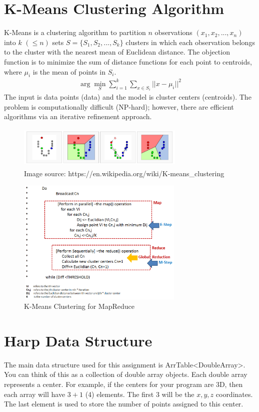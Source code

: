 \documentclass{article}
\begin{document}
\section*{K-Means Clustering Algorithm}
K-Means is a clustering algorithm to partition $n$ observations $(x_1,x_2,..., x_n)$ into $k$ $(\leq n)$ sets $S=\{S_1,S_2,...,S_k\}$ clusters in which each observation belongs to the cluster with the nearest mean of Euclidean distance. The objection function is to minimize the sum of distance functions for each point to centroids, where $\mu_i$ is the mean of points in $S_i$.
\begin{eqnarray*}
\arg\min\limits_S\sum\limits_{i=1}^k\sum\limits_{x\in S_i}{||x-\mu_i||}^2
\end{eqnarray*}
The input is data points (data) and the model is cluster centers (centroids). The problem is computationally difficult (NP-hard); however, there are efficient algorithms via an iterative refinement approach.

\begin{figure}[!htbp]
\includegraphics[width=8cm,height=2cm]{p7-1}
\centering
\caption{Image source: https://en.wikipedia.org/wiki/K-means\_clustering}
\end{figure}

\begin{figure}[!htbp]
\includegraphics[width=8cm,height=6cm]{p7-2}
\centering
\caption{K-Means Clustering for MapReduce}
\end{figure}

\section*{Harp Data Structure}
The main data structure used for this assignment is ArrTable\textless DoubleArray\textgreater. You can think of  this as a collection of double array objects. Each double array represents a center. For example, if  the centers for your program are 3D, then each array will have $3+1$ (4) elements. The first 3 will be the $x, y, z$ coordinates. The last element is used to store the number of points assigned to this center. 
\end{document}
